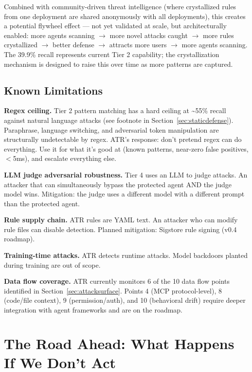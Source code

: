 \documentclass[11pt,letterpaper]{article}
\begin{document}
Combined with community-driven threat intelligence (where crystallized rules from one deployment are shared anonymously with all deployments), this creates a potential flywheel effect --- not yet validated at scale, but architecturally enabled: more agents scanning $\rightarrow$ more novel attacks caught $\rightarrow$ more rules crystallized $\rightarrow$ better defense $\rightarrow$ attracts more users $\rightarrow$ more agents scanning. The 39.9\% recall represents current Tier 2 capability; the crystallization mechanism is designed to raise this over time as more patterns are captured.


\subsection{Known Limitations}

\textbf{Regex ceiling.} Tier 2 pattern matching has a hard ceiling at \textasciitilde55\% recall against natural language attacks (see footnote in Section~\ref{sec:staticdefense}). Paraphrase, language switching, and adversarial token manipulation are structurally undetectable by regex. ATR's response: don't pretend regex can do everything. Use it for what it's good at (known patterns, near-zero false positives, $<$5ms), and escalate everything else.

\textbf{LLM judge adversarial robustness.} Tier 4 uses an LLM to judge attacks. An attacker that can simultaneously bypass the protected agent AND the judge model wins. Mitigation: the judge uses a different model with a different prompt than the protected agent.

\textbf{Rule supply chain.} ATR rules are YAML text. An attacker who can modify rule files can disable detection. Planned mitigation: Sigstore rule signing (v0.4 roadmap).

\textbf{Training-time attacks.} ATR detects runtime attacks. Model backdoors planted during training are out of scope.

\textbf{Data flow coverage.} ATR currently monitors 6 of the 10 data flow points identified in Section~\ref{sec:attacksurface}. Points 4 (MCP protocol-level), 8 (code/file context), 9 (permission/auth), and 10 (behavioral drift) require deeper integration with agent frameworks and are on the roadmap.


\section{The Road Ahead: What Happens If We Don't Act}
\label{sec:roadahead}
\end{document}
